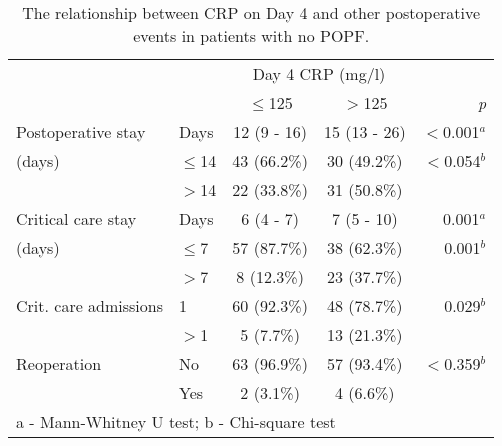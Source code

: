 \begin{table}[p]
	\centering
	\caption{The relationship between CRP on Day 4 and other postoperative events in patients with no POPF.}
	\label{table:crp_comp_CRP4_vs_LOS}
	\renewcommand{\arraystretch}{1.4} %
	\setlength{\tabcolsep}{9pt} %
	\begin{tabular}{|l l  c c r |}
		\hline
		                      &          & \multicolumn{2}{c}{Day 4 CRP (mg/l)} &  \\
		                      &          & $\leq$125   & $>$125                   & \textit{p}   \\ \hline
		Postoperative stay    & Days     & 12 (9 - 16) & 15 (13 - 26)             & $<$0.001$^a$ \\
		(days)                & $\leq$14 & 43 (66.2\%) & 30 (49.2\%)              & $<$0.054$^b$ \\
		                      & $>$14    & 22 (33.8\%) & 31 (50.8\%)              &  \\
		Critical care stay    & Days     & 6 (4 - 7)   & 7 (5 - 10)               & 0.001$^a$    \\
		(days)                & $\leq$7  & 57 (87.7\%) & 38 (62.3\%)              & 0.001$^b$    \\
		                      & $>$7     & 8 (12.3\%)  & 23 (37.7\%)              &  \\
		Crit. care admissions & 1        & 60 (92.3\%) & 48 (78.7\%)              & 0.029$^b$    \\
		                      & $>$1     & 5 (7.7\%)   & 13 (21.3\%)              &  \\
		Reoperation           & No       & 63 (96.9\%) & 57 (93.4\%)              & $<$0.359$^b$ \\
		                      & Yes      & 2 (3.1\%)   & 4 (6.6\%)                &  \\ \hline
		\multicolumn{5}{l}{a - Mann-Whitney U test; b - Chi-square test}
	\end{tabular}
\end{table}



